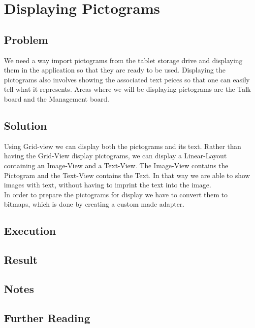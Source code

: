 \section{Displaying Pictograms} %

\subsection{Problem}
We need a way import pictograms from the tablet storage drive and displaying them in the application so that they are ready to be used.
Displaying the pictograms also involves showing the associated text peices so that one can easily tell what it represents.
Areas where we will be displaying pictograms are the Talk board and the Management board.

\subsection{Solution}
Using Grid-view we can display both the pictograms and its text.
Rather than having the Grid-View display pictograms, we can display a Linear-Layout containing an Image-View and a Text-View.
The Image-View contains the Pictogram and the Text-View contains the Text.
In that way we are able to show images with text, without having to imprint the text into the image.\\

In order to prepare the pictograms for display we have to convert them to bitmaps, which is done by creating a custom made adapter. 

\subsection{Execution}

\subsection{Result}

\subsection{Notes}

\subsection{Further Reading}
